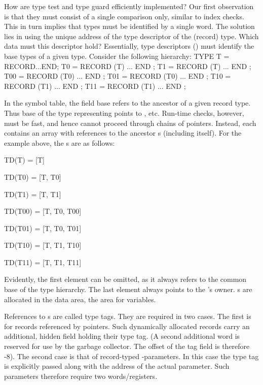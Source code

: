 How are type test and type guard efficiently implemented? Our first observation is that they must consist of a single comparison only, similar to index checks. This in turn implies that types must be identified by a single word. The solution lies in using the unique address of the type descriptor of the (record) type. Which data must this descriptor hold? Essentially, type descriptors () must identify the base types of a given type. Consider the following hierarchy:
\begintt
TYPE T  = RECORD...END;
     T0 = RECORD (T) ... END ;
     T1 = RECORD (T) ... END ;
     T00 = RECORD (T0) ... END ;
     T01 = RECORD (T0) ... END ;
     T10 = RECORD (T1) ... END ;
     T11 = RECORD (T1) ... END ;
\endtt


\noindent In the symbol table, the field base refers to the ancestor of a given record type. Thus base of the type representing  points to , etc. Run-time checks, however, must be fast, and hence cannot proceed through chains of pointers. Instead, each  contains an array with references to the ancestor s (including itself). For the example above, the s are as follows:

\smallskip
\item{} TD(T) = [T]
\item{} TD(T0) = [T, T0]
\item{} TD(T1) = [T, T1]
\item{} TD(T00) = [T, T0, T00]
\item{} TD(T01) = [T, T0, T01]
\item{} TD(T10) = [T, T1, T10]
\item{} TD(T11) = [T, T1, T11]
\smallskip

Evidently, the first element can be omitted, as it always refers to the common base of the type hierarchy. The last element always points to the ’s owner. s are allocated in the data area, the area for variables.

References to s are called type tags. They are required in two cases. The first is for records referenced by pointers. Such dynamically allocated records carry an additional, hidden field holding their type tag. (A second additional word is reserved for use by the garbage collector. The offset of the tag field is therefore -8). The second case is that of record-typed -parameters. In this case the type tag is explicitly passed along with the address of the actual parameter. Such parameters therefore require two words/registers.

